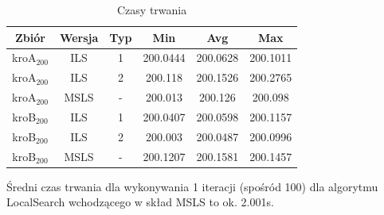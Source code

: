 \documentclass{article}
\begin{document}
\begin{table}[h!]
\centering
\begin{tabular}{ |c|c|c|c|c|c| } 
 \hline
 Zbiór & Wersja & Typ & Min & Avg & Max \\ 
  \hline
 kroA$_{200}$ & ILS & 1 & 200.0444 & 200.0628 & 200.1011 \\
  \hline
 kroA$_{200}$ & ILS & 2 & 200.118 & 200.1526 & 200.2765 \\
 \hline
 kroA$_{200}$ & MSLS & - & 200.013 & 200.126 & 200.098 \\
  \hline
 kroB$_{200}$ & ILS & 1 & 200.0407 & 200.0598 & 200.1157 \\
  \hline
 kroB$_{200}$ & ILS & 2 & 200.003 & 200.0487 & 200.0996 \\
 \hline
 kroB$_{200}$ & MSLS & - & 200.1207 & 200.1581 & 200.1457 \\
 \hline
\end{tabular}
\caption{Czasy trwania}
\end{table}

Średni czas trwania dla wykonywania 1 iteracji (spośród 100) dla algorytmu LocalSearch wchodzącego w skład MSLS to ok. 2.001s. \\
\end{document}
